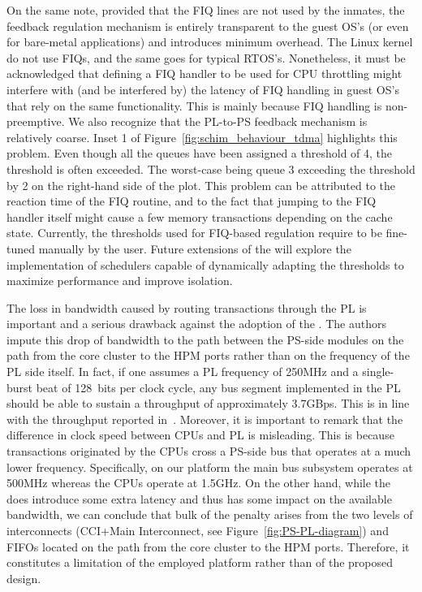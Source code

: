 {  On the same note, provided that the FIQ lines are not used by the
  inmates, the feedback regulation mechanism is entirely transparent
  to the guest OS's (or even for bare-metal applications) and
  introduces minimum overhead. The Linux kernel do not use FIQs, and
  the same goes for typical RTOS's. Nonetheless, it must be
  acknowledged that defining a FIQ handler to be used for CPU
  throttling might interfere with (and be interfered by) the latency
  of FIQ handling in guest OS's that rely on the same
  functionality. This is mainly because FIQ handling is
  non-preemptive. We also recognize that the PL-to-PS feedback
  mechanism is relatively coarse. Inset 1 of
  Figure~\ref{fig:schim_behaviour_tdma} highlights this problem. Even
  though all the queues have been assigned a threshold of 4, the
  threshold is often exceeded.  The worst-case being queue 3 exceeding
  the threshold by 2 on the right-hand side of the plot. This problem
  can be attributed to the reaction time of the FIQ routine, and to
  the fact that jumping to the FIQ handler itself might cause a few
  memory transactions depending on the cache state. Currently, the
  thresholds used for FIQ-based regulation require to be fine-tuned
  manually by the user. Future extensions of the \schim will explore
  the implementation of schedulers capable of dynamically adapting the
  thresholds to maximize performance and improve isolation.

  The loss in bandwidth caused by routing transactions through the PL
  is important and a serious drawback against the adoption of the
  \schim.  The authors impute this drop of bandwidth to the path
  between the PS-side modules on the path from the core cluster to the
  HPM ports rather than on the frequency of the PL side itself. In
  fact, if one assumes a PL frequency of 250MHz and a single-burst
  beat of 128~bits per clock cycle, any bus segment implemented in the
  PL should be able to sustain a throughput of approximately
  3.7GBps. This is in line with the throughput reported
  in~\cite{uiuc-xilinx-port-study}. Moreover, it is important to
  remark that the difference in clock speed between CPUs and PL is
  misleading. This is because transactions originated by the CPUs
  cross a PS-side bus that operates at a much lower
  frequency. Specifically, on our platform the main bus subsystem
  operates at 500MHz whereas the CPUs operate at 1.5GHz. On the other
  hand, while the \schim does introduce some extra latency and thus
  has some impact on the available bandwidth, we can conclude that
  bulk of the penalty arises from the two levels of interconnects
  (CCI+Main Interconnect, see Figure~\ref{fig:PS-PL-diagram}) and
  FIFOs located on the path from the core cluster to the HPM
  ports. Therefore, it constitutes a limitation of the employed
  platform rather than of the proposed design.
}

